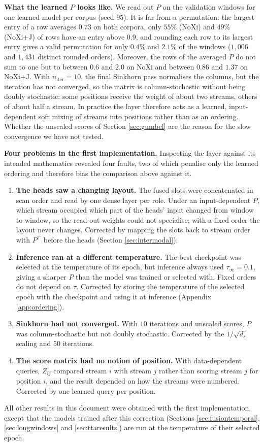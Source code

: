 \documentclass[10pt,a4paper,twocolumn]{article}
\begin{document}
	\textbf{What the learned $P$ looks like.} We read out $P$ on the validation windows for one learned model per corpus (seed $95$). It is far from a permutation: the largest entry of a row averages $0.73$ on both corpora, only $55\%$ (NoXi) and $49\%$ (NoXi+J) of rows have an entry above $0.9$, and rounding each row to its largest entry gives a valid permutation for only $0.4\%$ and $2.1\%$ of the windows ($1{,}006$ and $1{,}431$ distinct rounded orders). Moreover, the rows of the averaged $P$ do not sum to one but to between $0.6$ and $2.0$ on NoXi and between $0.86$ and $1.37$ on NoXi+J. With $n_{\text{iter}} = 10$, the final Sinkhorn pass normalises the columns, but the iteration has not converged, so the matrix is column-stochastic without being doubly stochastic: some positions receive the weight of about two streams, others of about half a stream. In practice the layer therefore acts as a learned, input-dependent soft mixing of streams into positions rather than as an ordering. Whether the unscaled scores of Section \ref{sec:gumbel} are the reason for the slow convergence we have not tested.
	
	\textbf{Four problems in the first implementation.} Inspecting the layer against its intended mathematics revealed four faults, two of which penalise only the learned ordering and therefore bias the comparison above against it.
	\begin{enumerate}
		\item \textbf{The heads saw a changing layout.} The fused slots were concatenated in scan order and read by one dense layer per role. Under an input-dependent $P$, which stream occupied which part of the heads' input changed from window to window, so the read-out weights could not specialise; with a fixed order the layout never changes. Corrected by mapping the slots back to stream order with $P^\top$ before the heads (Section \ref{sec:intermodal}).
		\item \textbf{Inference ran at a different temperature.} The best checkpoint was selected at the temperature of its epoch, but inference always used $\tau_\infty = 0.1$, giving a sharper $P$ than the model was trained or selected with. Fixed orders do not depend on $\tau$. Corrected by storing the temperature of the selected epoch with the checkpoint and using it at inference (Appendix \ref{app:ordering}).
		\item \textbf{Sinkhorn had not converged.} With $10$ iterations and unscaled scores, $P$ was column-stochastic but not doubly stochastic. Corrected by the $1/\sqrt{d_s}$ scaling and $50$ iterations.
		\item \textbf{The score matrix had no notion of position.} With data-dependent queries, $Z_{ij}$ compared stream $i$ with stream $j$ rather than scoring stream $j$ for position $i$, and the result depended on how the streams were numbered. Corrected by one learned query per position.
	\end{enumerate}
	All other results in this document were obtained with the first implementation, except that the models trained after this correction (Sections \ref{sec:fusiontemporal}, \ref{sec:longwindows} and \ref{sec:ttaresults}) are run at the temperature of their selected epoch.
\end{document}
